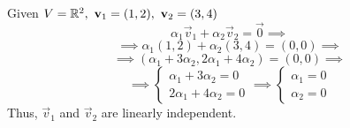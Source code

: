 \begin{example}
    Given $V = \set{R}^2,\ \vec{v}_1 = (1, 2),\ \vec{v}_2 = (3, 4)$
    $$ \alpha_1\vec{v}_1 + \alpha_2\vec{v}_2 = \vec{0} \implies$$
    $$ \implies \alpha_1(1, 2) + \alpha_2(3, 4) = (0, 0) \implies$$
    $$ \implies (\alpha_1 + 3\alpha_2, 2\alpha_1 + 4\alpha_2) = (0, 0) \implies$$
    $$
        \implies
        \left\{\begin{matrix}
        \alpha_1 + 3\alpha_2 = 0 \\ 
        2\alpha_1 + 4\alpha_2 = 0
        \end{matrix}\right.
        \implies
        \left\{\begin{matrix}
        \alpha_1 = 0 \\ 
        \alpha_2 = 0
        \end{matrix}\right.
    $$
    Thus, $\vec{v}_1$ and $\vec{v}_2$ are linearly independent.
\end{example}